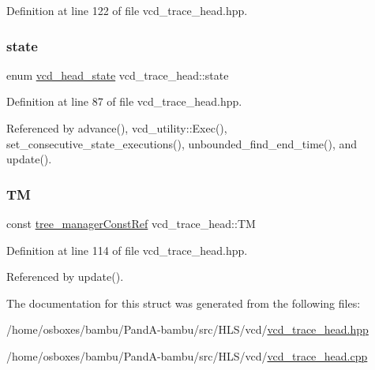 Definition at line 122 of file vcd\+\_\+trace\+\_\+head.\+hpp.

\mbox{\label{structvcd__trace__head_ad41fd0e7ee5a8f06fc7ef1fa8714ab24}} 
\subsubsection{\texorpdfstring{state}{state}}
{\footnotesize\ttfamily enum \hyperlink{structvcd__trace__head_ae433a47ff04aedfa841835d29f75207e}{vcd\+\_\+head\+\_\+state} vcd\+\_\+trace\+\_\+head\+::state}



Definition at line 87 of file vcd\+\_\+trace\+\_\+head.\+hpp.



Referenced by advance(), vcd\+\_\+utility\+::\+Exec(), set\+\_\+consecutive\+\_\+state\+\_\+executions(), unbounded\+\_\+find\+\_\+end\+\_\+time(), and update().

\mbox{\label{structvcd__trace__head_a8db2070e7bd8fa8d995f034143c860ad}} 
\subsubsection{\texorpdfstring{TM}{TM}}
{\footnotesize\ttfamily const \hyperlink{tree__manager_8hpp_a792e3f1f892d7d997a8d8a4a12e39346}{tree\+\_\+manager\+Const\+Ref} vcd\+\_\+trace\+\_\+head\+::\+TM}



Definition at line 114 of file vcd\+\_\+trace\+\_\+head.\+hpp.



Referenced by update().



The documentation for this struct was generated from the following files\+:\begin{DoxyCompactItemize}
\item 
/home/osboxes/bambu/\+Pand\+A-\/bambu/src/\+H\+L\+S/vcd/\hyperlink{vcd__trace__head_8hpp}{vcd\+\_\+trace\+\_\+head.\+hpp}\item 
/home/osboxes/bambu/\+Pand\+A-\/bambu/src/\+H\+L\+S/vcd/\hyperlink{vcd__trace__head_8cpp}{vcd\+\_\+trace\+\_\+head.\+cpp}\end{DoxyCompactItemize}
